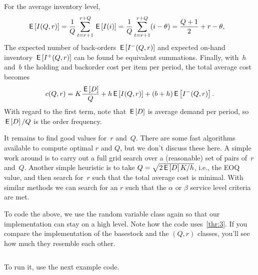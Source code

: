 \documentclass[queueing-book.tex]{subfiles}
\begin{document}
For the average inventory level,
\begin{align*}
   \,\mathsf{E}\left[I(Q,r)\right]
   &= \frac1Q\sum_{t=r+1}^{r+Q} \,\mathsf{E}\left[I(i)\right]
     = \frac1Q\sum_{t=r+1}^{r+Q} (i - \theta)
   = \frac{Q+1}2 + r - \theta,
\end{align*}
The  expected number of back-orders $\,\mathsf{E}\left[I^-(Q,r)\right]$ and expected on-hand inventory $\,\mathsf{E}\left[I^+(Q,r)\right]$ can be found be equivalent summations.
Finally, with~$h$ and~$b$ the holding and backorder cost per item per period,  the total average cost becomes
\begin{equation*}
c(Q,r) = K\frac{\,\mathsf{E}\left[D\right]}{Q} + h \,\mathsf{E}\left[I(Q,r)\right] +  (b+h) \,\mathsf{E}\left[I^-(Q,r)\right].
\end{equation*}
With regard to the first term, note that $\,\mathsf{E}\left[D\right]$ is average demand per period, so $\,\mathsf{E}\left[D\right] / Q$ is the order frequency.


It remains to find good values for~$r$ and~$Q$.
There are some fast algorithms available to compute optimal $r$ and $Q$, but  we don't discuss these here.
A simple work around is to carry out a full grid search over a (reasonable) set of pairs of~$r$ and~$Q$.
Another simple heuristic is to take $Q=\sqrt{2\,\mathsf{E}\left[D\right]K/h}$, i.e., the EOQ value, and then search for~$r$ such that the total average cost is minimal.
With similar methods we can search for an $r$ such that the $\alpha$ or $\beta$ service level criteria are met.

To code the above, we use the random variable class again so that our  implementation can stay on a high level. Note how the code uses~\cref{thr:3}.
If you compare the implementation of the basestock and the $(Q,r)$ classes, you'll see how much they resemble each other.
\inputminted[firstline=78, lastline=114]{python}{../code/lighthouse.py} %
To run it, use the next example code.
\inputminted[firstline=121, lastline=124]{python}{../code/lighthouse.py} %
\end{document}
